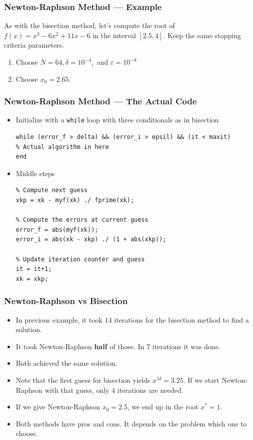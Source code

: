 \documentclass[11pt,xcolor={svgnames},aspectratio=169,usepdftitle=false]{beamer}
\begin{document}
\begin{frame}
  \frametitle{Newton-Raphson Method --- Example}
As with the bisection method, let's compute the root of $f(x) = x^3 - 6x^2 + 11x - 6$ in the interval $[2.5, 4]$. Keep the same stopping criteria parameters.
\begin{enumerate}
  \item Choose $N = 64, \delta = 10^{-4},$ and $\varepsilon = 10^{-8}$
  \item Choose $x_0 = 2.65$.
\end{enumerate}
\end{frame}

\begin{frame}[fragile]
  \frametitle{Newton-Raphson Method --- The Actual Code}
  \begin{itemize}
    \item Initialize with a \verb;while; loop with three conditionals as in bisection
\begin{lstlisting}
while (error_f > delta) && (error_i > epsil) && (it < maxit)
% Actual algorithm in here
end     
\end{lstlisting}
    \item Middle steps
\begin{lstlisting}
% Compute next guess
xkp = xk - myf(xk) ./ fprime(xk);
    
% Compute the errors at current guess
error_f = abs(myf(xk));
error_i = abs(xk - xkp) ./ (1 + abs(xkp));

% Update iteration counter and guess
it = it+1;
xk = xkp;
\end{lstlisting}
\end{itemize}
\end{frame}

\begin{frame}
  \frametitle{Newton-Raphson vs Bisection}
\begin{itemize}
  \item In previous example, it took $14$ iterations for the bisection method to find a solution.
  \item It took Newton-Raphson \alert{\textbf{half}} of those. In $7$ iterations it was done.
  \item Both achieved the same solution.
  \item Note that the first guess for bisection yields $x^M = 3.25$. If we start Newton-Raphson with that guess, only $4$ iterations are needed.
  \item If we give Newton-Raphson $x_0 = 2.5$, we end up in the root $x^* = 1$.
  \item Both methods have pros and cons. It depends on the problem which one to choose.
\end{itemize}
\end{frame}
\end{document}
